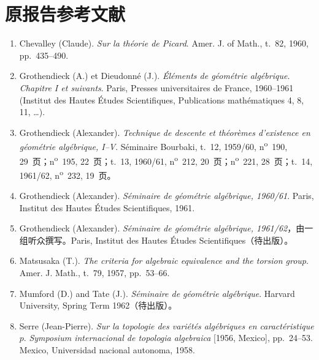 \section*{原报告参考文献}
\begin{enumerate}
\item[{[1]}]\label{fga3.vi-bib-1} Chevalley (Claude). \emph{Sur la théorie de Picard}. Amer. J. of Math., t.~82, 1960, pp.~435--490.
\item[{[2]}]\label{fga3.vi-bib-2} Grothendieck (A.) et Dieudonné (J.). \emph{Éléments de géométrie algébrique. Chapitre I et suivants}. Paris, Presses universitaires de France, 1960--1961 (Institut des Hautes Études Scientifiques, Publications mathématiques 4, 8, 11, \ldots).
\item[{[3]}]\label{fga3.vi-bib-3} Grothendieck (Alexander). \emph{Technique de descente et théorèmes d'existence en géométrie algébrique, I--V}. Séminaire Bourbaki, t.~12, 1959/60, n\textsuperscript{o}~190, 29~页；n\textsuperscript{o}~195, 22~页；t.~13, 1960/61, n\textsuperscript{o}~212, 20~页；n\textsuperscript{o}~221, 28~页；t.~14, 1961/62, n\textsuperscript{o}~232, 19~页。
\item[{[4]}]\label{fga3.vi-bib-4} Grothendieck (Alexander). \emph{Séminaire de géométrie algébrique, 1960/61}. Paris, Institut des Hautes Études Scientifiques, 1961.
\item[{[5]}]\label{fga3.vi-bib-5} Grothendieck (Alexander). \emph{Séminaire de géométrie algébrique, 1961/62}，由一组听众撰写。Paris, Institut des Hautes Études Scientifiques（待出版）。
\item[{[6]}]\label{fga3.vi-bib-6} Matsusaka (T.). \emph{The criteria for algebraic equivalence and the torsion group}. Amer. J. Math., t.~79, 1957, pp.~53--66.
\item[{[7]}]\label{fga3.vi-bib-7} Mumford (D.) and Tate (J.). \emph{Séminaire de géométrie algébrique}. Harvard University, Spring Term 1962（待出版）。
\item[{[8]}]\label{fga3.vi-bib-8} Serre (Jean-Pierre). \emph{Sur la topologie des variétés algébriques en caractéristique $p$}. \emph{Symposium internacional de topologia algebraica} [1956, Mexico], pp.~24--53. Mexico, Universidad nacional autonoma, 1958.
\end{enumerate}
